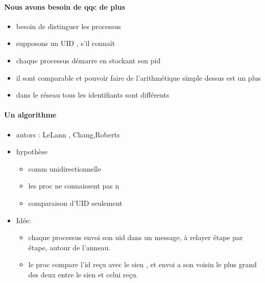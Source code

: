 \documentclass{article}
\begin{document}
\paragraph{Nous avons besoin de qqc de plus}
\begin{itemize}
\item besoin de distinguer les processus
\item supposons un UID , s'il connaît
\item chaque processus démarre en stockant son pid
\item il sont comparable et pouvoir faire de l'arithmétique simple dessus est un plus
\item dans le réseau tous les identifiants sont différents
\end{itemize}
\paragraph{Un algorithme}
\begin{itemize}
\item autors : LeLann , Chang,Roberts
\item hypothèse 
\begin{itemize}
\item comm unidirectionnelle
\item les proc ne connaissent pas n
\item comparaison d'UID seulement
\end{itemize}
\item Idée: 
\begin{itemize}
\item chaque processus envoi son uid dans un message, à relayer étape par étape, autour de l'anneau.
\item le proc compare l'id reçu avec le sien , et envoi a son voisin le plus grand des deux entre le sien et celui reçu.
\end{itemize}
\end{itemize}
\end{document}
